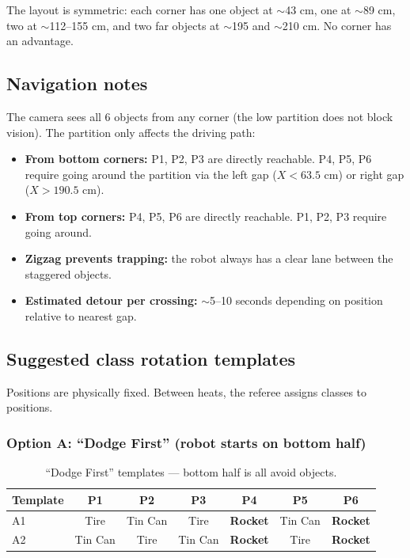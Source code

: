\documentclass[a4]{article}
\begin{document}
The layout is symmetric: each corner has one object at $\sim$43 cm, one at $\sim$89 cm, two at $\sim$112--155 cm, and two far objects at $\sim$195 and $\sim$210 cm. No corner has an advantage.

\subsection*{Navigation notes}

The camera sees all 6 objects from any corner (the low partition does not block vision). The partition only affects the driving path:

\begin{itemize}
    \item \textbf{From bottom corners:} P1, P2, P3 are directly reachable. P4, P5, P6 require going around the partition via the left gap ($X < 63.5$ cm) or right gap ($X > 190.5$ cm).
    \item \textbf{From top corners:} P4, P5, P6 are directly reachable. P1, P2, P3 require going around.
    \item \textbf{Zigzag prevents trapping:} the robot always has a clear lane between the staggered objects.
    \item \textbf{Estimated detour per crossing:} $\sim$5--10 seconds depending on position relative to nearest gap.
\end{itemize}

\subsection*{Suggested class rotation templates}

Positions are physically fixed. Between heats, the referee assigns classes to positions.

\subsubsection*{Option A: ``Dodge First'' (robot starts on bottom half)}

\begin{table}[H]
\centering
\begin{tabular}{lcccccc}
\toprule
\textbf{Template} & \textbf{P1} & \textbf{P2} & \textbf{P3} & \textbf{P4} & \textbf{P5} & \textbf{P6} \\
\midrule
A1 & Tire & Tin Can & Tire & \textbf{Rocket} & Tin Can & \textbf{Rocket} \\
A2 & Tin Can & Tire & Tin Can & \textbf{Rocket} & Tire & \textbf{Rocket} \\
\bottomrule
\end{tabular}
\caption{``Dodge First'' templates --- bottom half is all avoid objects.}
\end{table}
\end{document}

